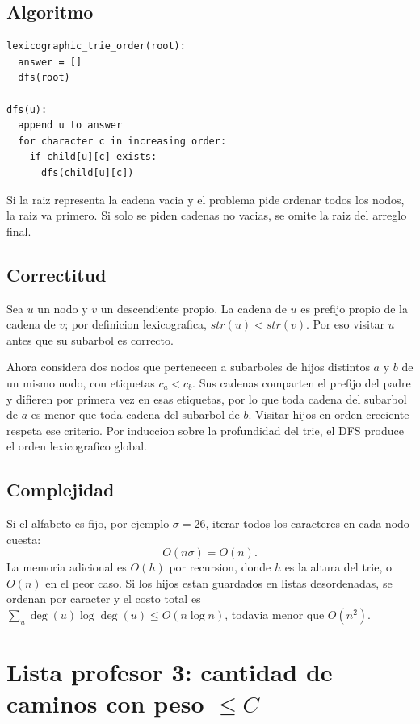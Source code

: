 \documentclass[10pt]{article}
\newcommand{\bigO}{O}
\begin{document}
\subsection{Algoritmo}
\begin{lstlisting}
lexicographic_trie_order(root):
  answer = []
  dfs(root)

dfs(u):
  append u to answer
  for character c in increasing order:
    if child[u][c] exists:
      dfs(child[u][c])
\end{lstlisting}

Si la raiz representa la cadena vacia y el problema pide ordenar todos los nodos, la raiz va primero. Si solo se
piden cadenas no vacias, se omite la raiz del arreglo final.

\subsection{Correctitud}
Sea \(u\) un nodo y \(v\) un descendiente propio. La cadena de \(u\) es prefijo propio de la cadena de \(v\);
por definicion lexicografica, \(str(u)<str(v)\). Por eso visitar \(u\) antes que su subarbol es correcto.

Ahora considera dos nodos que pertenecen a subarboles de hijos distintos \(a\) y \(b\) de un mismo nodo, con
etiquetas \(c_a<c_b\). Sus cadenas comparten el prefijo del padre y difieren por primera vez en esas etiquetas,
por lo que toda cadena del subarbol de \(a\) es menor que toda cadena del subarbol de \(b\). Visitar hijos en
orden creciente respeta ese criterio. Por induccion sobre la profundidad del trie, el DFS produce el orden
lexicografico global.

\subsection{Complejidad}
Si el alfabeto es fijo, por ejemplo \(\sigma=26\), iterar todos los caracteres en cada nodo cuesta:
\[
\bigO(n\sigma)=\bigO(n).
\]
La memoria adicional es \(\bigO(h)\) por recursion, donde \(h\) es la altura del trie, o \(\bigO(n)\) en el peor caso.
Si los hijos estan guardados en listas desordenadas, se ordenan por caracter y el costo total es
\(\sum_u \deg(u)\log \deg(u)\le \bigO(n\log n)\), todavia menor que \(\bigO(n^2)\).

\section{Lista profesor 3: cantidad de caminos con peso \(\le C\)}
\end{document}
